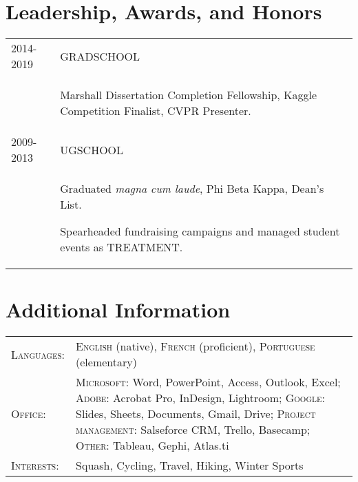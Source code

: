 \documentclass[a4paper,10pt]{article}
\begin{document}
\section{Leadership, Awards, and Honors}
\begin{supertabular}{p{3.4cm} p{13.9cm}}

	\textsc{2014-2019} 				& \textsc{GRADSCHOOL} \\
														& \begin{enumerate*}[label =$\diamond$, itemjoin={\newline}]
																\item \footnotesize Marshall Dissertation Completion Fellowship, Kaggle Competition Finalist, CVPR Presenter.
																\end{enumerate*} \vspace{2mm} \\

	\textsc{2009-2013} 				& \textsc{UGSCHOOL} \\
														& \begin{enumerate*}[label =$\diamond$, itemjoin={\newline}]
																\item \footnotesize  Graduated \emph{magna cum laude}, Phi Beta Kappa, Dean's List.
																\item \footnotesize  Spearheaded fundraising campaigns and managed student events as TREATMENT.
																\end{enumerate*} \vspace{2mm} \\



\end{supertabular}



\section{Additional Information}
\begin{supertabular}{p{3.4cm} p{13.9cm}}
	\textsc{Languages:}			& \small\textsc{English} (native), \textsc{French} (proficient), \textsc{Portuguese} (elementary) \vspace{1mm} \\

	\textsc{Office:}					& \small\textsc{Microsoft}: \footnotesize Word, PowerPoint, Access, Outlook, Excel;	\small\textsc{Adobe}: \footnotesize Acrobat Pro, InDesign, Lightroom; \small\textsc{Google}: \footnotesize Slides, Sheets, Documents, Gmail, Drive; \small\textsc{Project management:} \footnotesize Salseforce CRM, Trello, Basecamp; \small\textsc{Other:} \footnotesize Tableau, Gephi, Atlas.ti \vspace{1mm} \\
	\textsc{Interests:} 		& \small Squash, Cycling, Travel, Hiking, Winter Sports \\

\end{supertabular}
\end{document}

